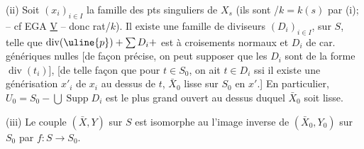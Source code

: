 (ii) Soit $(x_i)_{i\in I}$ la famille des pts  singuliers de $X_s$ (ils sont  /$k=k(s)$ par (i); -- cf EGA \uline{V} -- donc rat/$k$). Il existe une famille de diviseurs  $(D_i)_{i\in I}$,  sur $S$, telle que  $\operatorname{div}(\uline{p})+\sum D_i+$ est à croisements normaux et   $D_i$ de car. génériques nulles [de façon  précise, on peut supposer  que les $D_i$ sont de la forme $\operatorname{div}(t_i)$], [de telle façon que pour $t\in S_0$, on ait $t\in D_i$ ssi il existe une générisation $x'_i$ de $x_i$ au dessus de $t$,   $\bar X_0$   lisse sur $S_0$ en $x'$.] En particulier, $U_0=S_0-\bigcup\operatorname{Supp}D_i$ est le plus grand ouvert au dessus duquel  $\bar X_0$ soit lisse.

(iii) Le couple $(\bar X,Y)$ sur $S$ est isomorphe au  l'image inverse de $(\bar X_0,Y_0)$ sur $S_0$ par $f:S\longrightarrow S_0$.
